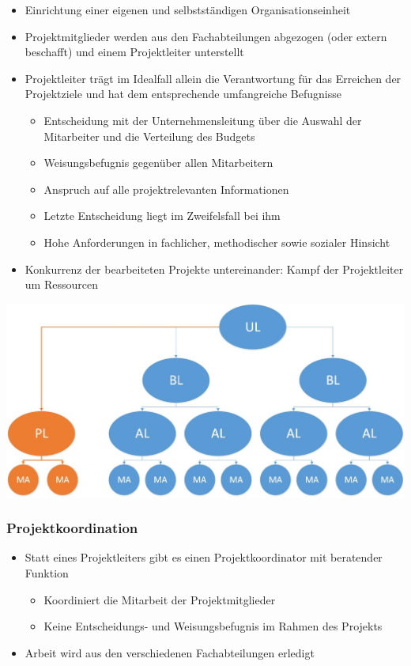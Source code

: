 \begin{itemize}
	\item Einrichtung einer eigenen und selbstständigen Organisationseinheit
	\item Projektmitglieder werden aus den Fachabteilungen abgezogen (oder extern beschafft) und einem Projektleiter unterstellt
	\item Projektleiter trägt im Idealfall allein die Verantwortung für das Erreichen der Projektziele und hat dem entsprechende umfangreiche Befugnisse
	\begin{itemize}
		\item Entscheidung mit der Unternehmensleitung über die Auswahl der Mitarbeiter und die Verteilung des Budgets
		\item Weisungsbefugnis gegenüber allen Mitarbeitern
		\item Anspruch auf alle projektrelevanten Informationen
		\item Letzte Entscheidung liegt im Zweifelsfall bei ihm
		\item Hohe Anforderungen in fachlicher, methodischer sowie sozialer Hinsicht
	\end{itemize}
	\item Konkurrenz der bearbeiteten Projekte untereinander: \ql Kampf der Projektleiter um Ressourcen\qr\
\end{itemize}

\includegraphics[scale=0.3]{1jahr_pictures/lf02-pic/lf02-reine-projektorganisation.jpg}

\subsubsection{Projektkoordination}
\begin{itemize}
	\item Statt eines Projektleiters gibt es einen Projektkoordinator mit beratender Funktion
	\begin{itemize}
		\item Koordiniert die Mitarbeit der Projektmitglieder
		\item Keine Entscheidungs- und Weisungsbefugnis im Rahmen des Projekts
	\end{itemize}
	\item Arbeit wird aus den verschiedenen Fachabteilungen erledigt
\end{itemize}

